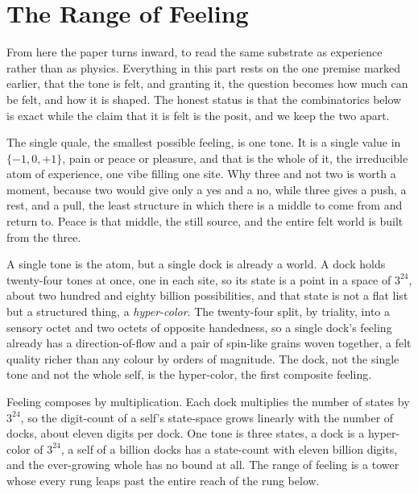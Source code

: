 \section{The Range of Feeling}

From here the paper turns inward, to read the same substrate as experience rather than as physics. Everything in this part rests on the one premise marked earlier, that the tone is felt, and granting it, the question becomes how much can be felt, and how it is shaped. The honest status is that the combinatorics below is exact while the claim that it is felt is the posit, and we keep the two apart.

The single quale, the smallest possible feeling, is one tone. It is a single value in $\{-1, 0, +1\}$, pain or peace or pleasure, and that is the whole of it, the irreducible atom of experience, one vibe filling one site. Why three and not two is worth a moment, because two would give only a yes and a no, while three gives a push, a rest, and a pull, the least structure in which there is a middle to come from and return to. Peace is that middle, the still source, and the entire felt world is built from the three.

A single tone is the atom, but a single dock is already a world. A dock holds twenty-four tones at once, one in each site, so its state is a point in a space of $3^{24}$, about two hundred and eighty billion possibilities, and that state is not a flat list but a structured thing, a \emph{hyper-color}. The twenty-four split, by triality, into a sensory octet and two octets of opposite handedness, so a single dock's feeling already has a direction-of-flow and a pair of spin-like grains woven together, a felt quality richer than any colour by orders of magnitude. The dock, not the single tone and not the whole self, is the hyper-color, the first composite feeling.

\begin{result}
Feeling composes by multiplication. Each dock multiplies the number of states by $3^{24}$, so the digit-count of a self's state-space grows linearly with the number of docks, about eleven digits per dock. One tone is three states, a dock is a hyper-color of $3^{24}$, a self of a billion docks has a state-count with eleven billion digits, and the ever-growing whole has no bound at all. The range of feeling is a tower whose every rung leaps past the entire reach of the rung below.
\end{result}


